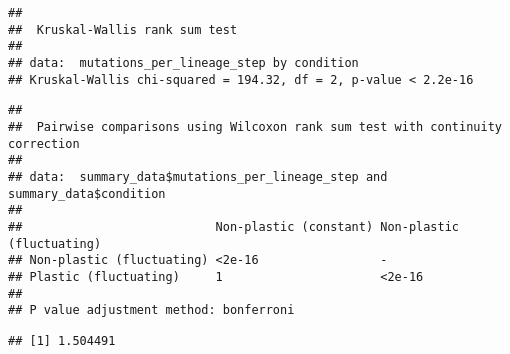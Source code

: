 \documentclass[]{book}
\newenvironment{Shaded}{\begin{snugshade}}{\end{snugshade}}
\newcommand{\DataTypeTok}[1]{\textcolor[rgb]{0.13,0.29,0.53}{#1}}
\newcommand{\KeywordTok}[1]{\textcolor[rgb]{0.13,0.29,0.53}{\textbf{#1}}}
\newcommand{\NormalTok}[1]{#1}
\newcommand{\OperatorTok}[1]{\textcolor[rgb]{0.81,0.36,0.00}{\textbf{#1}}}
\newcommand{\StringTok}[1]{\textcolor[rgb]{0.31,0.60,0.02}{#1}}
\begin{document}
\begin{verbatim}
## 
##  Kruskal-Wallis rank sum test
## 
## data:  mutations_per_lineage_step by condition
## Kruskal-Wallis chi-squared = 194.32, df = 2, p-value < 2.2e-16
\end{verbatim}

\begin{Shaded}
\end{Shaded}

\begin{verbatim}
## 
##  Pairwise comparisons using Wilcoxon rank sum test with continuity correction 
## 
## data:  summary_data$mutations_per_lineage_step and summary_data$condition 
## 
##                           Non-plastic (constant) Non-plastic (fluctuating)
## Non-plastic (fluctuating) <2e-16                 -                        
## Plastic (fluctuating)     1                      <2e-16                   
## 
## P value adjustment method: bonferroni
\end{verbatim}

\begin{Shaded}
\end{Shaded}

\begin{verbatim}
## [1] 1.504491
\end{verbatim}

\begin{Shaded}
\end{Shaded}
\end{document}
